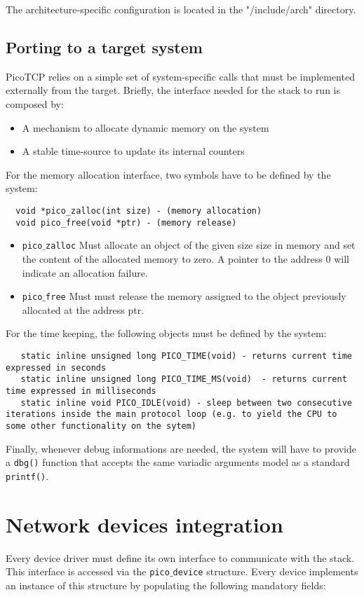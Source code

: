 The architecture-specific configuration is located in the "/include/arch"
directory.

\subsection{Porting to a target system}
PicoTCP relies on a simple set of system-specific calls that must be
implemented externally from the target. Briefly, the interface needed for
the stack to run is composed by:
\begin{itemize}
\item A mechanism to allocate dynamic memory on the system
\item A stable time-source to update its internal counters
\end{itemize} 

For the memory allocation interface, two symbols have to be defined by the system:
\begin{verbatim}
  void *pico_zalloc(int size) - (memory allocation) 
  void pico_free(void *ptr) - (memory release)
\end{verbatim}

\begin{itemize}
\item \texttt{pico$\_$zalloc} Must allocate an object of the given size size in memory
and set the content of the allocated memory to zero. A pointer to the address 0 will
indicate an allocation failure.
\item \texttt{pico$\_$free} Must must release the memory assigned to the object previously
allocated at the address ptr.
\end{itemize}


For the time keeping, the following objects must be defined by the system:	%
\begin{verbatim}
   static inline unsigned long PICO_TIME(void) - returns current time expressed in seconds
   static inline unsigned long PICO_TIME_MS(void)  - returns current time expressed in milliseconds
   static inline void PICO_IDLE(void) - sleep between two consecutive iterations inside the main protocol loop (e.g. to yield the CPU to some other functionality on the sytem)
\end{verbatim}

Finally, whenever debug informations are needed, the system will have to provide a
\texttt{dbg()} function that accepts the same variadic arguments model as a standard \texttt{printf()}.


\section{Network devices integration}
Every device driver must define its own interface to communicate with the stack.
This interface is accessed via the \texttt{pico$\_$device} structure. Every device implements
an instance of this structure by populating the following mandatory fields:


